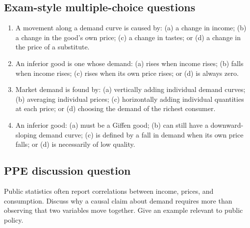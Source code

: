 \subsection*{Exam-style multiple-choice questions}
\begin{enumerate}[resume,label=\arabic*.]
  \item A movement along a demand curve is caused by: (a) a change in income; (b) a change in the good's own price; (c) a change in tastes; or (d) a change in the price of a substitute.
  \item An inferior good is one whose demand: (a) rises when income rises; (b) falls when income rises; (c) rises when its own price rises; or (d) is always zero.
  \item Market demand is found by: (a) vertically adding individual demand curves; (b) averaging individual prices; (c) horizontally adding individual quantities at each price; or (d) choosing the demand of the richest consumer.
  \item An inferior good: (a) must be a Giffen good; (b) can still have a downward-sloping demand curve; (c) is defined by a fall in demand when its own price falls; or (d) is necessarily of low quality.
\end{enumerate}

\subsection*{PPE discussion question}

\noindent Public statistics often report correlations between income, prices, and consumption. Discuss why a causal claim about demand requires more than observing that two variables move together. Give an example relevant to public policy.
